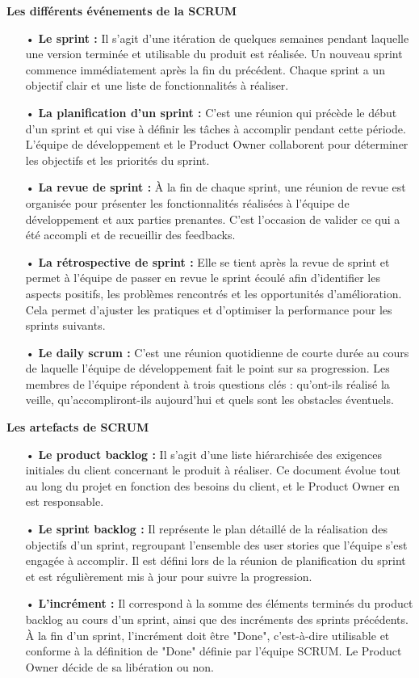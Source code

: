 \textbf{\large{Les différents événements de la SCRUM}}
\medskip
\begin{itemize}
    \item[•] \textbf{Le sprint :} Il s'agit d'une itération de quelques semaines pendant laquelle une version terminée et utilisable du produit est réalisée. Un nouveau sprint commence immédiatement après la fin du précédent. Chaque sprint a un objectif clair et une liste de fonctionnalités à réaliser.
    \item[•] \textbf{La planification d'un sprint :} C'est une réunion qui précède le début d'un sprint et qui vise à définir les tâches à accomplir pendant cette période. L'équipe de développement et le Product Owner collaborent pour déterminer les objectifs et les priorités du sprint.
    \item[•] \textbf{La revue de sprint :} À la fin de chaque sprint, une réunion de revue est organisée pour présenter les fonctionnalités réalisées à l'équipe de développement et aux parties prenantes. C'est l'occasion de valider ce qui a été accompli et de recueillir des feedbacks.
    \item[•] \textbf{La rétrospective de sprint :} Elle se tient après la revue de sprint et permet à l'équipe de passer en revue le sprint écoulé afin d'identifier les aspects positifs, les problèmes rencontrés et les opportunités d'amélioration. Cela permet d'ajuster les pratiques et d'optimiser la performance pour les sprints suivants.
    \item[•] \textbf{Le daily scrum :} C'est une réunion quotidienne de courte durée au cours de laquelle l'équipe de développement fait le point sur sa progression. Les membres de l'équipe répondent à trois questions clés : qu'ont-ils réalisé la veille, qu'accompliront-ils aujourd'hui et quels sont les obstacles éventuels.\\
\end{itemize}

\textbf{\large{Les artefacts de SCRUM}}
\medskip
\begin{itemize}
    \item[•] \textbf{Le product backlog :} Il s'agit d'une liste hiérarchisée des exigences initiales du client concernant le produit à réaliser. Ce document évolue tout au long du projet en fonction des besoins du client, et le Product Owner en est responsable.
    \item[•] \textbf{Le sprint backlog :} Il représente le plan détaillé de la réalisation des objectifs d'un sprint, regroupant l'ensemble des user stories que l'équipe s'est engagée à accomplir. Il est défini lors de la réunion de planification du sprint et est régulièrement mis à jour pour suivre la progression.
    \item[•] \textbf{L'incrément :} Il correspond à la somme des éléments terminés du product backlog au cours d'un sprint, ainsi que des incréments des sprints précédents. À la fin d'un sprint, l'incrément doit être "Done", c'est-à-dire utilisable et conforme à la définition de "Done" définie par l'équipe SCRUM. Le Product Owner décide de sa libération ou non.
\end{itemize}

